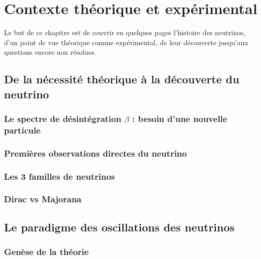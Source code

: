 \chapter{Contexte théorique et expérimental}
    
    Le but de ce chapitre est de couvrir en quelques pages l'histoire des neutrinos, d'un point de vue théorique comme expérimental, de leur découverte jusqu'aux questions encore non résolues.
    
    \section{De la nécessité théorique à la découverte du neutrino}
    
        \subsection{Le spectre de désintégration \texorpdfstring{$\beta$}{b} : besoin d'une nouvelle particule}
    
        \subsection{Premières observations directes du neutrino}
    
        \subsection{Les 3 familles de neutrinos}
        
        \subsection{Dirac vs Majorana}\label{sec::dirac_majorana}
    
    \section{Le paradigme des oscillations des neutrinos}
    
        \subsection{Genèse de la théorie}
        
